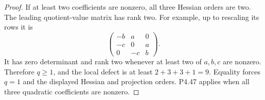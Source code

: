 \begin{proof}
If at least two coefficients are nonzero, all three
Hessian orders are two. The leading quotient-value
matrix has rank two. For example, up to rescaling
its rows it is
\[
 \begin{pmatrix}-b&a&0\\-c&0&a\\0&-c&b\end{pmatrix}.
\]
It has zero determinant and rank two whenever at
least two of $a,b,c$ are nonzero. Therefore $q\ge1$,
and the local defect is at least $2+3+3+1=9$.
Equality forces $q=1$ and the displayed Hessian and
projection orders. P4.47 applies when all three
quadratic coefficients are nonzero.
\end{proof}
